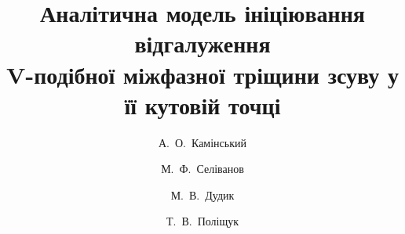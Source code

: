 \title{\textbf{Аналітична модель ініціювання відгалуження\\
V-подібної міжфазної тріщини зсуву у її кутовій точці}}

\author[1]{А.~О.~Камінський}
\author[1]{М.~Ф.~Селіванов}
\author[1,2]{М.~В.~Дудик}
\author[2]{Т.~В.~Поліщук}


\date{}

